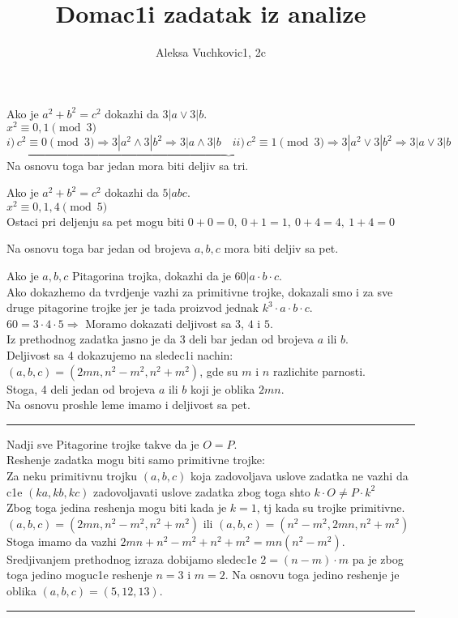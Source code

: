 \documentclass[11pt]{article}
\title{\bf{Domac1i zadatak iz analize}}
\author{\Large Aleksa Vuchkovic1, 2c}
\date{}
\renewcommand{\qedsymbol}{\rule{0.7em}{0.7em}}
\begin{document}
\maketitle
\begin{zad}
Ako je $a^2+b^2=c^2$ dokazhi da $3|a \lor 3|b$.\\[3mm]
$x^2\equiv 0,1\pmod{3}$\\[1mm]

$\underbrace{ i)\, c^2\equiv 0\pmod{3} \Rightarrow 3|a^2 \land 3|b^2 \Rightarrow 3|a \land 3|b \quad ii)\, c^2\equiv 1\pmod{3} \Rightarrow 3|a^2 \lor 3|b^2 \Rightarrow 3|a \lor 3|b}$\\
\centering Na osnovu toga bar jedan mora biti deljiv sa tri.

\end{zad}
\begin{lem}
Ako je $a^2+b^2=c^2$ dokazhi da $5|abc$.\\[3mm]
$x^2\equiv 0,1,4\pmod{5}$\\[1mm]
Ostaci pri deljenju sa pet mogu biti $0+0=0, \ 0+1=1,\ 0+4=4,\ 1+4=0$
\begin{center}
    Na osnovu toga bar jedan od brojeva $a,b,c$ mora biti deljiv sa pet.
\end{center}
\end{lem}
\begin{zad}
Ako je $a,b,c$ Pitagorina trojka, dokazhi da je $60|a\cdot b\cdot c$.\\[3mm]
Ako dokazhemo da tvrdjenje vazhi za primitivne trojke, dokazali smo i za sve druge pitagorine trojke jer je tada proizvod jednak $k^3\cdot a\cdot b\cdot c$.\\[2mm]
$60=3\cdot 4\cdot 5 \Rightarrow$ Moramo dokazati deljivost sa $3$, $4$ i $5$.\\
Iz prethodnog zadatka jasno je da $3$ deli bar jedan od brojeva $a$ ili $b$.\\
Deljivost sa 4 dokazujemo na sledec1i nachin:\\
$(a,b,c)=(2mn,n^2-m^2,n^2+m^2)$, gde su $m$ i $n$ razlichite parnosti.\\
Stoga, 4 deli jedan od brojeva $a$ ili $b$ koji je oblika $2mn$.\\
Na osnovu proshle leme imamo i deljivost sa pet. \qedsymbol
\end{zad}
\begin{zad}Nadji sve Pitagorine trojke takve da je $O=P$.\\[3mm]
Reshenje zadatka mogu biti samo primitivne trojke:\\Za neku primitivnu trojku $(a,b,c)$ koja zadovoljava uslove zadatka ne vazhi da c1e $(ka,kb,kc)$ zadovoljavati uslove zadatka zbog toga shto $k\cdot O\neq P\cdot k^2$\\
Zbog toga jedina reshenja mogu biti kada je $k=1$, tj kada su trojke primitivne.\\[2mm]
$(a,b,c)=(2mn,n^2-m^2,n^2+m^2)$ ili $(a,b,c)=(n^2-m^2,2mn,n^2+m^2)$\\
Stoga imamo da vazhi $2mn+n^2-m^2+n^2+m^2=mn(n^2-m^2)$.\\
Sredjivanjem prethodnog izraza dobijamo sledec1e $2=(n-m)\cdot m$ pa je zbog toga jedino moguc1e reshenje $n=3$ i $m=2$. Na osnovu toga jedino reshenje je oblika $(a,b,c)=(5,12,13)$. \qedsymbol
\end{zad}
\end{document}
